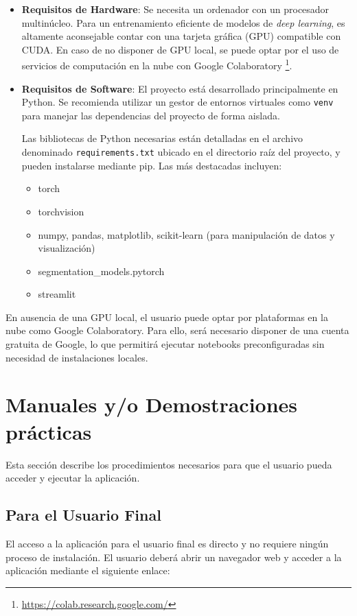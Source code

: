 \begin{itemize}
    \item \textbf{Requisitos de Hardware}: Se necesita un ordenador con un procesador multinúcleo. Para un entrenamiento eficiente de modelos de \textit{deep learning}, es altamente aconsejable contar con una tarjeta gráfica (GPU) compatible con CUDA. En caso de no disponer de GPU local, se puede optar por el uso de servicios de computación en la nube con Google Colaboratory \footnote{\url{https://colab.research.google.com/}}.
    \item \textbf{Requisitos de Software}: El proyecto está desarrollado principalmente en Python. Se recomienda utilizar un gestor de entornos virtuales como \texttt{venv} para manejar las dependencias del proyecto de forma aislada. 
    
    Las bibliotecas de Python necesarias están detalladas en el archivo denominado \texttt{requirements.txt} ubicado en el directorio raíz del proyecto, y pueden instalarse mediante pip. Las más destacadas incluyen:
    \begin{itemize}
        \item torch
        \item torchvision
        \item numpy, pandas, matplotlib, scikit-learn (para manipulación de datos y visualización)
        \item segmentation\_models.pytorch
        \item streamlit
    \end{itemize}
\end{itemize}
En ausencia de una GPU local, el usuario puede optar por plataformas en la nube como Google Colaboratory. Para ello, será necesario disponer de una cuenta gratuita de Google, lo que permitirá ejecutar notebooks preconfiguradas sin necesidad de instalaciones locales.


\section{Manuales y/o Demostraciones prácticas}
Esta sección describe los procedimientos necesarios para que el usuario pueda acceder y ejecutar la aplicación. 
\subsection{Para el Usuario Final}
El acceso a la aplicación para el usuario final es directo y no requiere ningún proceso de instalación. El usuario deberá abrir un navegador web y acceder a la aplicación mediante el siguiente enlace: 

